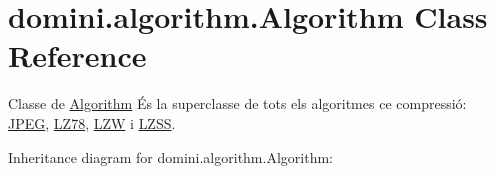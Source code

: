 \hypertarget{classdomini_1_1algorithm_1_1Algorithm}{}\section{domini.\+algorithm.\+Algorithm Class Reference}
\label{classdomini_1_1algorithm_1_1Algorithm}


Classe de \hyperlink{classdomini_1_1algorithm_1_1Algorithm}{Algorithm} És la superclasse de tots els algoritmes ce compressió\+: \hyperlink{classdomini_1_1algorithm_1_1JPEG}{J\+P\+EG}, \hyperlink{classdomini_1_1algorithm_1_1LZ78}{L\+Z78}, \hyperlink{classdomini_1_1algorithm_1_1LZW}{L\+ZW} i \hyperlink{classdomini_1_1algorithm_1_1LZSS}{L\+Z\+SS}.  




Inheritance diagram for domini.\+algorithm.\+Algorithm\+:
